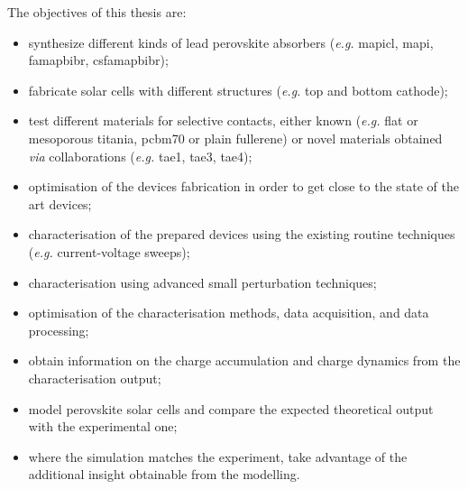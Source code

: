 The objectives of this thesis are:\nolinebreak
\begin{itemize}
	\item synthesize different kinds of lead perovskite absorbers (\textsl{e.g.} \gls{mapicl}, \gls{mapi}, \gls{famapbibr}, \gls{csfamapbibr});
	\item fabricate solar cells with different structures (\textsl{e.g.} top and bottom cathode);
	\item test different materials for selective contacts, either known (\textsl{e.g.} flat or mesoporous titania, \gls{pcbm70} or plain fullerene) or novel materials obtained \textsl{via} collaborations (\textsl{e.g.} \gls{tae1}, \gls{tae3}, \gls{tae4});
	\item optimisation of the devices fabrication in order to get close to the state of the art devices;
	\item characterisation of the prepared devices using the existing routine techniques (\textsl{e.g.} current\hyp{}voltage sweeps);
	\item characterisation using advanced small perturbation techniques;
	\item optimisation of the characterisation methods, data acquisition, and data processing;
	\item obtain information on the charge accumulation and charge dynamics from the characterisation output;
	\item model perovskite solar cells and compare the expected theoretical output with the experimental one;
	\item where the simulation matches the experiment, take advantage of the additional insight obtainable from the modelling.	
\end{itemize} 

